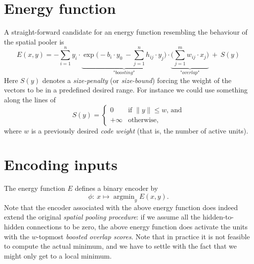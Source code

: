 \documentclass[titlepage]{amsart}
\theoremstyle{definition}
\begin{document}
\section{Energy function}
% 
% 
A straight-forward candidate for an energy function resembling the behaviour of 
the spatial pooler is
\begin{equation}
\label{eqn:numenta energy}
  E(x,y) = - \sum_{i=1}^n 
        y_i 
        \cdot
        \underbrace{
        \exp\Big( - b_i\cdot y_0 \ -  \sum_{j=1}^n h_{ij} \cdot y_j \Big)
        }_{\textit{"boosting"}}
        \cdot
        \underbrace{
        \Big(\sum_{j=1}^m w_{ij}\cdot x_j \Big)  
        }_{\textit{"overlap"}}
        \ + \  
        S(y)
\end{equation}
Here $S(y)$ denotes a \textit{size-penalty} (or \textit{size-bound}) forcing 
the weight of the vectors to be in a predefined desired range. 
For instance we could use something along the lines of
$$
    S(y) = 
    \begin{cases}
            0  &  \text{if $\|y\| \leq w$, and} \\
      +\infty  &  \text{otherwise,}
    \end{cases}
$$
where $w$ is a previously desired \textit{code weight} (that is, the number of active units).
% 
% 
\section{Encoding inputs}
% 
% 
The energy function $E$ defines a binary encoder by
$$
    \phi\colon \  x \mapsto \mathop{\arg\min}_y E(x,y).
$$
Note that the encoder associated with the above energy function does indeed 
extend the original \textit{spatial pooling procedure}: if we assume all the 
hidden-to-hidden connections to be zero, the above energy function does activate 
the units with the $w$-topmost \textit{boosted overlap scores}.
Note that in practice it is not feasible to compute the actual minimum, 
and we have to settle with the fact that we might only get to a local minimum.
% 
% 
\end{document}
